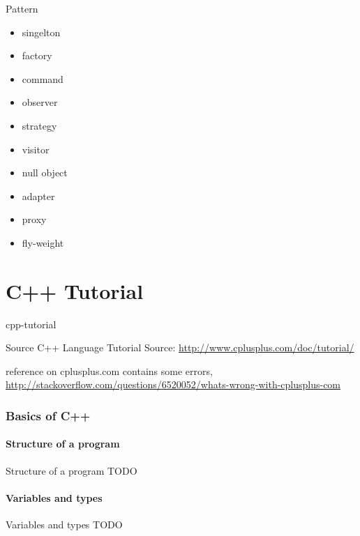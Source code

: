 \documentclass{beamer}
\begin{document}
\begin{frame}{Pattern}
\begin{itemize}
  \item singelton
  \item factory
  \item command
  \item observer
  \item strategy
  \item visitor
  \item null object
  \item adapter
  \item proxy
  \item fly-weight
\end{itemize}
\end{frame}

\part{C++ Tutorial}{cpp-tutorial}

\begin{frame}{Source}
C++ Language Tutorial
Source: \url{http://www.cplusplus.com/doc/tutorial/}
\begin{block}

reference on cplusplus.com contains some errors,
\url{http://stackoverflow.com/questions/6520052/whats-wrong-with-cplusplus-com}
\end{block}
\end{frame}

\section{Basics of C++}

\subsection{Structure of a program}
\begin{frame}{Structure of a program}
TODO
\end{frame}

\subsection{Variables and types}
\begin{frame}{Variables and types}
TODO
\end{frame}
\end{document}
